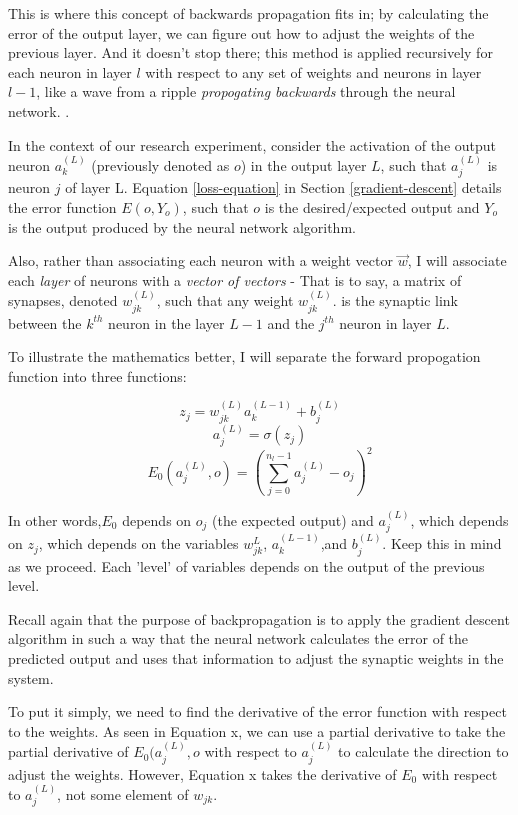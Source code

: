 \documentclass[12pt]{article}
\begin{document}
This is where this concept of backwards propagation fits in; by calculating the error of the output layer, we can figure out how to adjust the weights of the previous layer. And it doesn't stop there; this method is applied recursively for each neuron in layer $l$ with respect to any set of weights and neurons in layer $l - 1$, like a wave from a ripple \textit{propogating backwards} through the neural network. \textcite{Nielsen2015}.


In the context of our research experiment, consider the activation of the output neuron $a_k^{(L)}$ (previously denoted as $o$) in the output layer $L$, such that $a_j^{(L)}$ is neuron $j$ of layer L. Equation \ref{loss-equation} in Section \ref{gradient-descent} details the error function $E(o, Y_o)$, such that $o$ is the desired/expected output and $Y_o$ is the output produced by the neural network algorithm.

Also, rather than associating each neuron with a weight vector $\vec{w}$, I will associate each \textit{layer} of neurons with a \textit{vector of vectors} - That is to say, a matrix of synapses, denoted $w_{jk}^{(L)}$, such that any weight $w_{jk}^{(L)}$. is the synaptic link between the $k^{th}$ neuron in the layer $L-1$ and the $j^{th}$ neuron in layer $L$.

To illustrate the mathematics better, I will separate the forward propogation function into three functions:

\[ z_j = w_{jk}^{ (L)}a_k^{(L-1)} + b_j^{(L)} \]
\[ a_j^{(L)} =\sigma (z_j) \]
\[ E_0(a_j^{(L)}, o) = (\sum_{j=0}^{n_l-1} a_j^{(L)} - o_j)^2 \]

In other words,$E_0$ depends on $o_j$ (the expected output) and $a_j^{(L)}$, which depends on $z_j$, which depends on the variables $w_{jk}^{L}$, $a_k^{(L-1)}$,and $b_j^{(L)}$. Keep this in mind as we proceed. Each 'level' of variables depends on the output of the previous level.

Recall again that the purpose of backpropagation is to apply the gradient descent algorithm in such a way that the neural network calculates the error of the predicted output and uses that information to adjust the synaptic weights in the system.

To put it simply, we need to find the derivative of the error function with respect to the weights. As seen in Equation x, we can use a partial derivative to take the partial derivative of \(E_0(a_j^{(L)}, o\) with respect to \(a_j^{(L)}\) to calculate the direction to adjust the weights. However, Equation x takes the derivative of \(E_0\) with respect to \(a_j^{(L)}\), not some element of $w_{jk}$.
\end{document}

